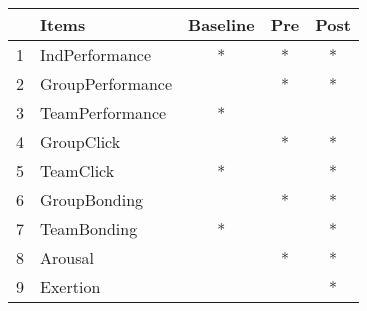 \begin{table}[ht]
\centering
\begin{tabular}{llccc}
  \hline
 & Items & Baseline & Pre & Post \\ 
  \hline
1 & IndPerformance & * & * & * \\ 
  2 & GroupPerformance &  & * & * \\ 
  3 & TeamPerformance & * &  &  \\ 
  4 & GroupClick &  & * & * \\ 
  5 & TeamClick & * &  & * \\ 
  6 & GroupBonding &  & * & * \\ 
  7 & TeamBonding & * &  & * \\ 
  8 & Arousal &  & * & * \\ 
  9 & Exertion &  &  & * \\ 
   \hline
\end{tabular}
\label{tab:athleteDescriptivesTrainingOverall}
\end{table}
